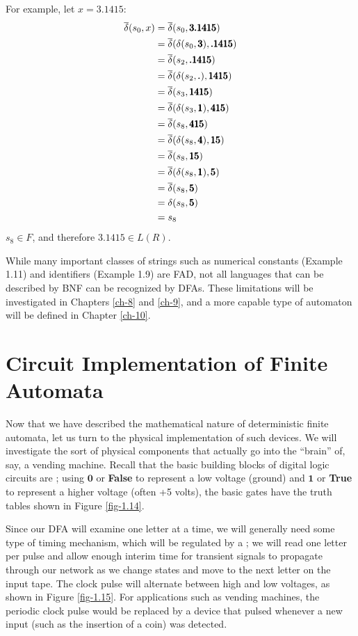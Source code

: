 For example, let $x = \pmb{3.1415}$:
\begin{align*}
\overline{\delta}(s_0,x) &= \overline{\delta}(s_0,\pmb{3.1415}) \\
&= \overline{\delta}(\delta(s_0,\pmb{3}),\pmb{.1415}) \\
&= \overline{\delta}(s_2,\pmb{.1415}) \\
&= \overline{\delta}(\delta(s_2,\pmb{.}),\pmb{1415}) \\
&= \overline{\delta}(s_3,\pmb{1415}) \\
&= \overline{\delta}(\delta(s_3,\pmb{1}),\pmb{415}) \\
&= \overline{\delta}(s_8,\pmb{415}) \\
&= \overline{\delta}(\delta(s_8,\pmb{4}),\pmb{15}) \\
&= \overline{\delta}(s_8,\pmb{15}) \\
&= \overline{\delta}(\delta(s_8,\pmb{1}),\pmb{5}) \\
&= \overline{\delta}(s_8,\pmb{5}) \\
&= \delta(s_8,\pmb{5}) \\
&= s_8
\end{align*}
$s_8 \in F$, and therefore $\pmb{3.1415}\in L(R)$.

While many important classes of strings such as numerical constants (Example
1.11) and identifiers (Example 1.9) are FAD, not all languages
that can be described by BNF can be recognized by DFAs. These limitations will
be investigated in Chapters \ref{ch-8} and \ref{ch-9}, and a more capable type
of automaton will be defined in Chapter \ref{ch-10}.

\section{Circuit Implementation of Finite Automata}\label{sec-1.4}

Now that we have described the mathematical nature of deterministic finite
automata, let us turn to the physical implementation of such devices. We will
investigate the sort of physical components that actually go into the ``brain''
of, say, a vending machine. Recall that the basic building blocks of digital
logic circuits are \emph{}; using $\pmb{0}$ or \textbf{False}
to represent a low voltage (ground) and $\pmb{1}$ or \textbf{True} to represent a
higher voltage (often +5 volts), the basic gates have the truth tables shown in
Figure \ref{fig-1.14}.

Since our DFA will examine one letter at a time, we will generally need some
type of timing mechanism, which will be regulated by a
\emph{}; we will read one letter per pulse and allow enough
interim time for transient signals to propagate through our network as we change
states and move to the next letter on the input tape. The clock pulse will
alternate between high and low voltages, as shown in Figure \ref{fig-1.15}.
For applications such as vending machines, the periodic clock pulse would be
replaced by a device that pulsed whenever a new input (such as the insertion of
a coin) was detected.

